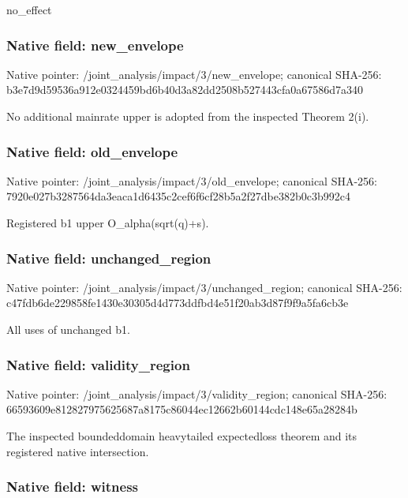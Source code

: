 \documentclass[10pt,a4paper]{article}
\begin{document}
no\_effect


\subsubsection{Native field: new\_envelope}


Native pointer: /joint\_analysis/impact/3/new\_envelope; canonical SHA-256: b3e7d9d59536a912e0324459\allowbreak{}bd6b40d3a82dd2508b527443\allowbreak{}cfa0a67586d7a340


No additional mainrate upper is adopted from the inspected Theorem 2(i).


\subsubsection{Native field: old\_envelope}


Native pointer: /joint\_analysis/impact/3/old\_envelope; canonical SHA-256: 7920e027b3287564da3eaca1\allowbreak{}d6435c2cef6f6cf28b5a2f27\allowbreak{}dbe382b0c3b992c4


Registered b1 upper O\_alpha(sqrt(q)+s).


\subsubsection{Native field: unchanged\_region}


Native pointer: /joint\_analysis/impact/3\allowbreak{}/unchanged\_region; canonical SHA-256: c47fdb6de229858fe1430e30\allowbreak{}305d4d773ddfbd4e51f20ab3\allowbreak{}d87f9f9a5fa6cb3e


All uses of unchanged b1.


\subsubsection{Native field: validity\_region}


Native pointer: /joint\_analysis/impact/3\allowbreak{}/validity\_region; canonical SHA-256: 66593609e812827975625687\allowbreak{}a8175c86044ec12662b60144\allowbreak{}cdc148e65a28284b


The inspected boundeddomain heavytailed expectedloss theorem and its registered native intersection.


\subsubsection{Native field: witness}
\end{document}
